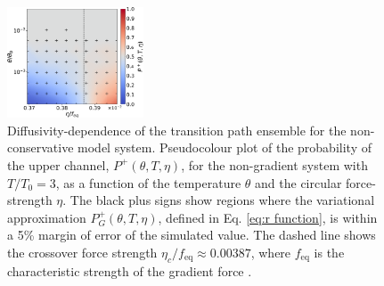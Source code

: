 \begin{figure}[t]
\includegraphics[width=0.36\textwidth]{figs_part1/mcmc/switch_noneq_channel_rates}
\centering \caption{Diffusivity-dependence of the transition path ensemble for the non-conservative
model system. Pseudocolour plot of the probability of the upper channel,
$P^{+}(\theta,T,\eta)$, for the non-gradient system with $T/T_{0}=3$,
as a function of the temperature $\theta$ and the circular force-strength
$\eta$. The black plus signs show regions where the variational approximation
$P_{G}^{+}(\theta,T,\eta)$, defined in Eq. \eqref{eq:r function},
is within a 5\% margin of error of the simulated value. The dashed
line shows the crossover force strength $\eta_{c}/f_{\text{eq}}\approx0.00387$,
where $f_{\text{eq}}$ is the characteristic strength of the gradient
force \citep{note:SI}.}
\label{fig:switch noneq}
\end{figure}

